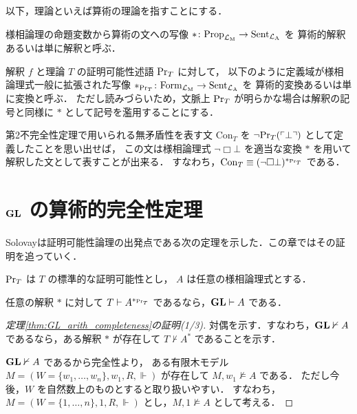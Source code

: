 \documentclass{jlreq}
\begin{document}
\begin{remark}
	以下，理論といえば算術の理論を指すことにする．
\end{remark}

\begin{definition}
	様相論理の命題変数から算術の文への写像 $* \colon \mathrm{Prop}_{\mathcal{L}_\mathrm{M}} \to \mathrm{Sent}_{\mathcal{L}_\mathrm{A}}$ を
	算術的解釈あるいは単に解釈と呼ぶ．
\end{definition}

\begin{definition}
	解釈 $f$ と理論 $T$ の証明可能性述語 $\mathrm{Pr}_T$ に対して，
	以下のように定義域が様相論理式一般に拡張された写像 $*_{\mathrm{Pr}_T} \colon \mathrm{Form}_{\mathcal{L}_\mathrm{M}} \to \mathrm{Sent}_{\mathcal{L}_\mathrm{A}}$ を
	算術的変換あるいは単に変換と呼ぶ．
	ただし読みづらいため，文脈上 $\mathrm{Pr}_T$ が明らかな場合は解釈の記号と同様に $*$ として記号を濫用することにする．
\end{definition}

\begin{example}
	第2不完全性定理で用いられる無矛盾性を表す文 $\mathrm{Con}_T$ を $\lnot \mathrm{Pr}_T(\ulcorner \bot \urcorner)$ として定義したことを思い出せば，
	この文は様相論理式 $\lnot \Box \bot$ を適当な変換 $*$ を用いて解釈した文として表すことが出来る．
	すなわち，$\mathrm{Con}_T \equiv (\lnot \Box \bot)^{*_{\mathrm{Pr}_T}}$ である．
\end{example}



\section{$\mathbf{GL}$ の算術的完全性定理}

Solovay\cite{solovay_provability_1976}は証明可能性論理の出発点である次の定理を示した．この章ではその証明を追っていく．

\begin{theorem}\label{thm:GL_arith_completeness}
	$\mathrm{Pr}_T$ は $T$ の標準的な証明可能性とし，
	$A$ は任意の様相論理式とする．

	任意の解釈 $*$ に対して $T \vdash A^{*_{\mathrm{Pr}_T}}$ であるなら，$\mathbf{GL} \vdash A$ である．
\end{theorem}

\begin{proof}[定理\ref{thm:GL_arith_completeness}の証明(1/3)]
	対偶を示す．すなわち，$\mathbf{GL} \nvdash A$ であるなら，ある解釈 $*$ が存在して $T \nvdash A^*$ であることを示す．

	$\mathbf{GL} \nvdash A$ であるから完全性より，
	ある有限木モデル $M = (W = \{w_1, \dots, w_n\}, w_1, R, \Vdash)$ が存在して $M,w_1 \nvDash A$ である．
	ただし今後，$W$ を自然数上のものとすると取り扱いやすい．
	すなわち，$M = (W = \{1,\dots,n\}, 1, R, \Vdash)$ とし，$M,1 \nvDash A$ として考える．
\end{proof}
\end{document}
